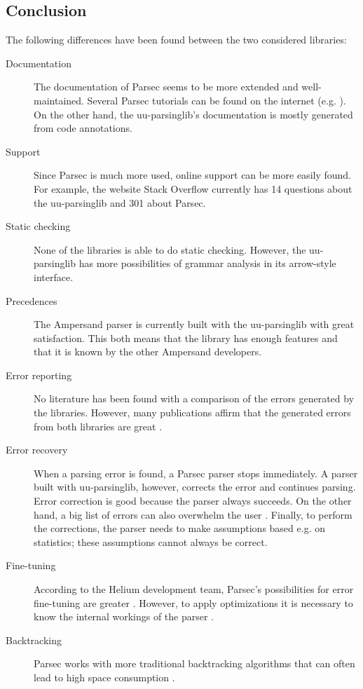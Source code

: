 \subsection{Conclusion}
The following differences have been found between the two considered libraries:
\begin{description}
	\item[Documentation] The documentation of Parsec seems to be more extended and well-maintained.
		Several Parsec tutorials can be found on the internet (e.g. \cite{using-parsec}).
		On the other hand, the uu-parsinglib's documentation is mostly generated from code annotations.
	\item[Support] Since Parsec is much more used, online support can be more easily found.
		For example, the website Stack Overflow currently has 14 questions about the uu-parsinglib and 301 about Parsec.
	\item[Static checking] None of the libraries is able to do static checking.
		However, the uu-parsinglib has more possibilities of grammar analysis in its arrow-style interface.
	\item[Precedences] The Ampersand parser is currently built with the uu-parsinglib with great satisfaction.
		This both means that the library has enough features and that it is known by the other Ampersand developers.
	\item[Error reporting] No literature has been found with a comparison of the errors generated by the libraries.
		However, many publications affirm that the generated errors from both libraries are great \cite{helium-parser,benchmark,uu-doc,error-correcting,parsec}.
	\item[Error recovery] When a parsing error is found, a Parsec parser stops immediately.
		A parser built with uu-parsinglib, however, corrects the error and continues parsing.
		Error correction is good because the parser always succeeds.
		On the other hand, a big list of errors can also overwhelm the user \cite{heeren-error}.
		Finally, to perform the corrections, the parser needs to make assumptions based e.g. on statistics;
		these assumptions cannot always be correct.
	\item[Fine-tuning] According to the Helium development team, Parsec's possibilities for error fine-tuning are greater \cite{helium-parser}.
		However, to apply optimizations it is necessary to know the internal workings of the parser \cite{uu-doc}.
	\item[Backtracking] Parsec works with more traditional backtracking algorithms \cite{parsec} that can often lead to high space consumption \cite{uu-doc}.

\end{description}
